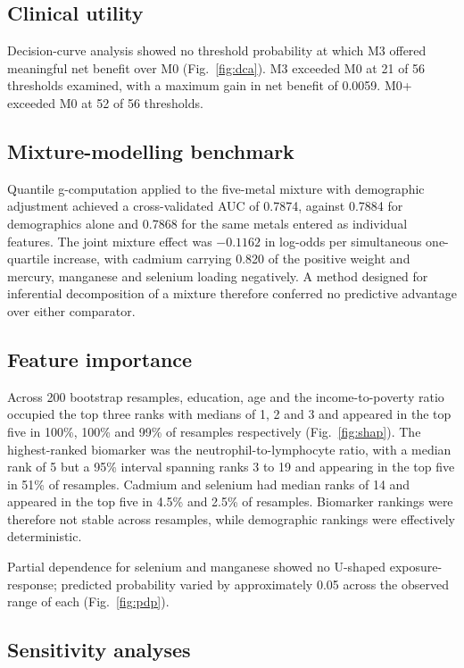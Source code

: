 \documentclass[12pt]{article}
\begin{document}
\subsection*{Clinical utility}

Decision-curve analysis showed no threshold probability at which M3 offered meaningful net benefit over M0 (Fig.~\ref{fig:dca}). M3 exceeded M0 at 21 of 56 thresholds examined, with a maximum gain in net benefit of 0.0059. M0+ exceeded M0 at 52 of 56 thresholds.

\subsection*{Mixture-modelling benchmark}

Quantile g-computation applied to the five-metal mixture with demographic adjustment achieved a cross-validated AUC of 0.7874, against 0.7884 for demographics alone and 0.7868 for the same metals entered as individual features. The joint mixture effect was $-0.1162$ in log-odds per simultaneous one-quartile increase, with cadmium carrying 0.820 of the positive weight and mercury, manganese and selenium loading negatively. A method designed for inferential decomposition of a mixture therefore conferred no predictive advantage over either comparator.

\subsection*{Feature importance}

Across 200 bootstrap resamples, education, age and the income-to-poverty ratio occupied the top three ranks with medians of 1, 2 and 3 and appeared in the top five in 100\%, 100\% and 99\% of resamples respectively (Fig.~\ref{fig:shap}). The highest-ranked biomarker was the neutrophil-to-lymphocyte ratio, with a median rank of 5 but a 95\% interval spanning ranks 3 to 19 and appearing in the top five in 51\% of resamples. Cadmium and selenium had median ranks of 14 and appeared in the top five in 4.5\% and 2.5\% of resamples. Biomarker rankings were therefore not stable across resamples, while demographic rankings were effectively deterministic.

Partial dependence for selenium and manganese showed no U-shaped exposure-response; predicted probability varied by approximately 0.05 across the observed range of each (Fig.~\ref{fig:pdp}).

\subsection*{Sensitivity analyses}
\end{document}
